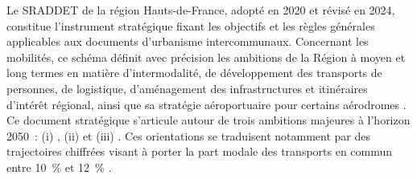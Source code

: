 \begin{refsegment}
Le \acrfull{SRADDET} de la région Hauts-de-France, adopté en 2020 et révisé en 2024, constitue l'instrument stratégique fixant les objectifs et les règles générales applicables aux documents d'urbanisme intercommunaux. Concernant les mobilités, ce schéma définit avec précision les ambitions de la Région à moyen et long termes en matière d'intermodalité, de développement des transports de personnes, de logistique, d'aménagement des infrastructures et itinéraires d'intérêt régional, ainsi que sa stratégie aéroportuaire pour certains aérodromes \textcolor{blue}{\autocite[1]{cerema_sraddet_2024}}. Ce document stratégique s’articule autour de trois ambitions majeures à l’horizon 2050~: (i) , (ii)  et (iii)  \textcolor{blue}{\autocite[7]{region_hauts-de-france_sraddet_2024}}. Ces orientations se traduisent notamment par des trajectoires chiffrées visant à porter la part modale des transports en commun entre 10~\% et 12~\% \textcolor{blue}{\autocite[169]{region_hauts-de-france_sraddet_2024}}.%


\end{refsegment}
